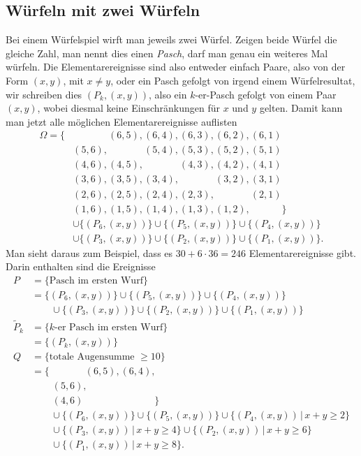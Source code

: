 \subsection{Würfeln mit zwei Würfeln}
Bei einem Würfelspiel wirft man jeweils zwei Würfel.
Zeigen beide Würfel
die gleiche Zahl, man nennt dies einen {\em Pasch}, darf man genau ein
weiteres Mal würfeln.
Die Elementarereignisse sind also entweder einfach Paare, also von
der Form $(x,y)$, mit $x\ne y$, oder ein Pasch gefolgt von irgend einem
Würfelresultat, wir schreiben dies $(P_k, (x,y))$, also ein $k$-er-Pasch
gefolgt von einem Paar $(x,y)$, wobei diesmal keine Einschränkungen für
$x$ und $y$ gelten.
Damit kann man jetzt alle möglichen Elementarereignisse auflisten
\begin{align*}
\Omega=\{
&\phantom{(6,6),} (6,5), (6,4), (6,3), (6,2), (6,1)\\
&(5,6), \phantom{(5,5),} (5,4), (5,3), (5,2), (5,1)\\
&(4,6), (4,5), \phantom{(4,4),} (4,3), (4,2), (4,1)\\
&(3,6), (3,5), (3,4), \phantom{(3,3),} (3,2), (3,1)\\
&(2,6), (2,5), (2,4), (2,3), \phantom{(2,2),} (2,1)\\
&(1,6), (1,5), (1,4), (1,3), (1,2), \phantom{(1,1)}
\}
\\
&\cup
\{(P_6,(x,y))\}
\cup
\{(P_5,(x,y))\}
\cup
\{(P_4,(x,y))\}
\\
&\cup
\{(P_3,(x,y))\}
\cup
\{(P_2,(x,y))\}
\cup
\{(P_1,(x,y))\}.
\end{align*}
Man sieht daraus zum Beispiel, dass es $30 + 6\cdot 36=246$
Elementarereignisse gibt.
Darin enthalten sind die Ereignisse
\begin{align*}
P&=\{\text{Pasch im ersten Wurf}\}\\
&=
\{(P_6,(x,y))\}
\cup
\{(P_5,(x,y))\}
\cup
\{(P_4,(x,y))\}
\\
&\qquad \cup
\{(P_3,(x,y))\}
\cup
\{(P_2,(x,y))\}
\cup
\{(P_1,(x,y))\}
\\
\tilde P_k&=\{\text{$k$-er Pasch im ersten Wurf}\}\\
   &=\{(P_k,(x,y))\}
\\
Q&=\{\text{totale Augensumme $\ge 10$}\}\\
&=\{\phantom{(6,6),} (6,5), (6,4), \\
&\phantom{\;=\{}(5,6), \phantom{(5,5), (5,4)} \\
&\phantom{\;=\{}(4,6)\phantom{, (4,5), (4,4)}
\}
\\
&\qquad\cup
\{(P_6,(x,y))\}
\cup
\{(P_5,(x,y))\}
\cup
\{(P_4,(x,y))\,|\, x+y \ge 2\}
\\
&\qquad\cup
\{(P_3,(x,y))\,|\, x+y \ge 4\}
\cup
\{(P_2,(x,y))\,|\, x+y \ge 6\}
\\
&\qquad
\cup
\{(P_1,(x,y))\,|\, x+y \ge 8\}.
\end{align*}

